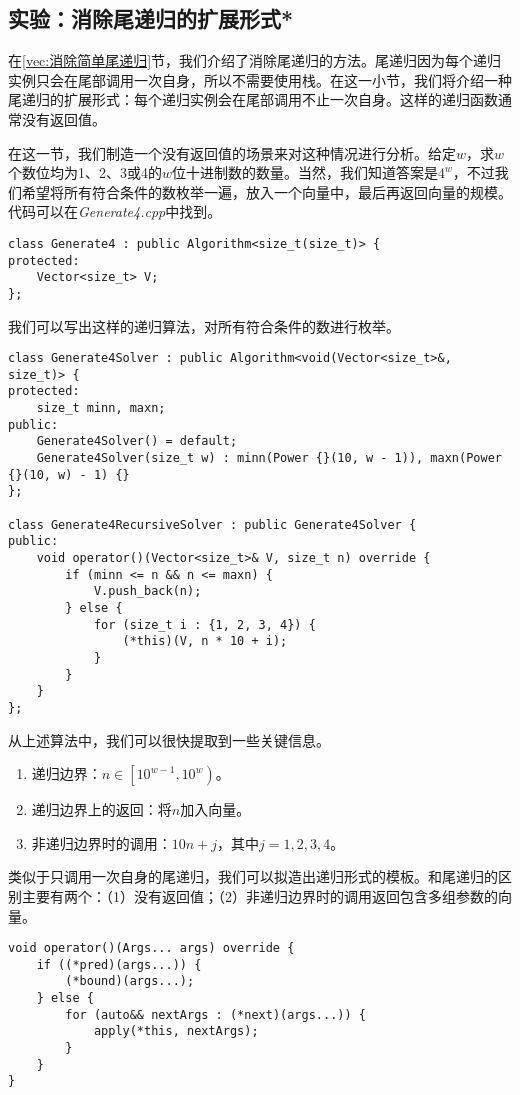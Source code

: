 \subsection{实验：消除尾递归的扩展形式*}
\label{sta:消除扩展尾递归}
在\ref{vec:消除简单尾递归}节，我们介绍了消除尾递归的方法。尾递归因为每个递归实例只会在尾部调用一次自身，所以不需要使用栈。在这一小节，我们将介绍一种尾递归的扩展形式：每个递归实例会在尾部调用不止一次自身。这样的递归函数通常没有返回值。

在这一节，我们制造一个没有返回值的场景来对这种情况进行分析。给定$w$，求$w$个数位均为1、2、3或4的$w$位十进制数的数量。当然，我们知道答案是$4^w$，不过我们希望将所有符合条件的数枚举一遍，放入一个向量中，最后再返回向量的规模。代码可以在\textit{Generate4.cpp}中找到。

\begin{lstlisting}
class Generate4 : public Algorithm<size_t(size_t)> {
protected:
    Vector<size_t> V;
};
\end{lstlisting}

我们可以写出这样的递归算法，对所有符合条件的数进行枚举。
\begin{lstlisting}
class Generate4Solver : public Algorithm<void(Vector<size_t>&, size_t)> {
protected:
    size_t minn, maxn;
public:
    Generate4Solver() = default;
    Generate4Solver(size_t w) : minn(Power {}(10, w - 1)), maxn(Power {}(10, w) - 1) {}
};

class Generate4RecursiveSolver : public Generate4Solver {
public:
    void operator()(Vector<size_t>& V, size_t n) override {
        if (minn <= n && n <= maxn) {
            V.push_back(n);
        } else {
            for (size_t i : {1, 2, 3, 4}) {
                (*this)(V, n * 10 + i);
            }
        }
    }
};
\end{lstlisting}

从上述算法中，我们可以很快提取到一些关键信息。
\begin{enumerate}
    \item 递归边界：$n\in \left[10^{w-1},10^w\right)$。
    \item 递归边界上的返回：将$n$加入向量。
    \item 非递归边界时的调用：$10n+j$，其中$j=1,2,3,4$。
\end{enumerate}

类似于只调用一次自身的尾递归，我们可以拟造出递归形式的模板。和尾递归的区别主要有两个：（1）没有返回值；（2）非递归边界时的调用返回包含多组参数的向量。

\begin{lstlisting}
void operator()(Args... args) override {
    if ((*pred)(args...)) {
        (*bound)(args...);
    } else {
        for (auto&& nextArgs : (*next)(args...)) {
            apply(*this, nextArgs);
        }
    }
}
\end{lstlisting}

